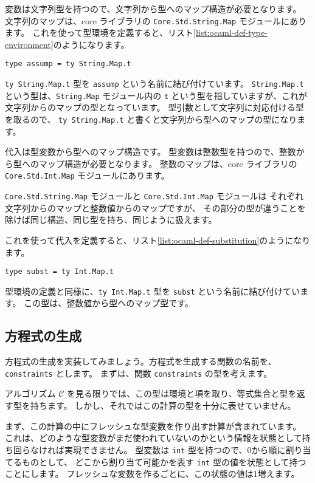 変数は文字列型を持つので、文字列から型へのマップ構造が必要となります。
文字列のマップは、core ライブラリの \texttt{Core.Std.String.Map} モジュールにあります。
これを使って型環境を定義すると、リスト\ref{list:ocaml-def-type-environment}のようになります。

\begin{lstlisting}[caption=型環境の定義, label=list:ocaml-def-type-environment]
type assump = ty String.Map.t
\end{lstlisting}

\texttt{ty String.Map.t} 型を \texttt{assump} という名前に結び付けています。
\texttt{String.Map.t} という型は、\texttt{String.Map} モジュール内の \texttt{t}
という型を指していますが、これが文字列からのマップの型となっています。
型引数として文字列に対応付ける型を取るので、
\texttt{ty String.Map.t} と書くと文字列から型へのマップの型になります。

代入は型変数から型へのマップ構造です。
型変数は整数型を持つので、整数から型へのマップ構造が必要となります。
整数のマップは、core ライブラリの \texttt{Core.Std.Int.Map} モジュールにあります。

\texttt{Core.Std.String.Map} モジュールと \texttt{Core.Std.Int.Map} モジュールは
それぞれ文字列からのマップと整数値からのマップですが、
その部分の型が違うことを除けば同じ構造、同じ型を持ち、同じように扱えます。

これを使って代入を定義すると、リスト\ref{list:ocaml-def-substitution}のようになります。

\begin{lstlisting}[caption=代入の定義, label=list:ocaml-def-substitution]
type subst = ty Int.Map.t
\end{lstlisting}

型環境の定義と同様に、\texttt{ty Int.Map.t} 型を \texttt{subst} という名前に結び付けています。
この型は、整数値から型へのマップ型です。

\subsection{方程式の生成}

方程式の生成を実装してみましょう。方程式を生成する関数の名前を、\texttt{constraints} とします。
まずは、関数 \texttt{constraints} の型を考えます。

アルゴリズム $\mathcal C$ を見る限りでは、この型は環境と項を取り、等式集合と型を返す型を持ちます。
しかし、それではこの計算の型を十分に表せていません。

まず、この計算の中にフレッシュな型変数を作り出す計算が含まれています。
これは、どのような型変数がまだ使われていないのかという情報を状態として持ち回らなければ実現できません。
型変数は \texttt{int} 型を持つので、0から順に割り当てるものとして、
どこから割り当て可能かを表す \texttt{int} 型の値を状態として持つことにします。
フレッシュな変数を作るごとに、この状態の値は1増えます。


